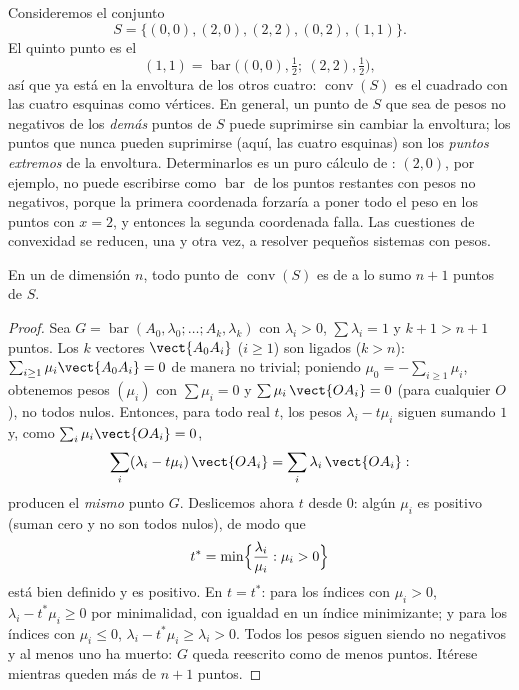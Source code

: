 \begin{example}\label{ex:b2:affine:squarehull}
Consideremos el conjunto
\[
S = \{(0,0), (2,0), (2,2), (0,2), (1,1)\} .
\]
El quinto punto es el 
\[
(1,1) = \operatorname{bar}\bigl((0,0), \tfrac12;\ (2,2),
\tfrac12\bigr),
\]
así que ya está en la envoltura de los otros cuatro:
$\operatorname{conv}(S)$ es el cuadrado con las cuatro esquinas como
vértices. En general, un punto de $S$ que sea  de pesos no
negativos de los \emph{demás} puntos de $S$ puede suprimirse sin
cambiar la envoltura; los puntos que nunca pueden suprimirse (aquí,
las cuatro esquinas) son los \emph{puntos extremos} de la envoltura.
Determinarlos es un puro cálculo de : $(2,0)$, por
ejemplo, no puede escribirse como $\operatorname{bar}$ de los puntos
restantes con pesos no negativos, porque la primera coordenada
forzaría a poner todo el peso en los puntos con $x = 2$, y entonces
la segunda coordenada falla. Las cuestiones de convexidad se reducen,
una y otra vez, a resolver pequeños sistemas con pesos.
\end{example}

\begin{theorem}[Carathéodory]\label{thm:b2:affine:caratheodory}
En un  de dimensión $n$, todo punto de
$\operatorname{conv}(S)$ es  de a lo sumo $n + 1$ puntos de
$S$.
\end{theorem}

\begin{proof}
Sea $G = \operatorname{bar}(A_0, \lambda_0; \dots; A_k, \lambda_k)$
con $\lambda_i > 0$, $\sum\lambda_i = 1$ y $k + 1 > n + 1$ puntos.
Los $k$ vectores $\vect{A_0A_i}$ ($i \geq 1$) son ligados ($k > n$):
$\sum_{i\geq1}\mu_i \vect{A_0A_i} = 0$ de manera no trivial; poniendo
$\mu_0 = -\sum_{i\geq1}\mu_i$, obtenemos pesos $(\mu_i)$ con
$\sum\mu_i = 0$ y $\sum \mu_i\,\vect{OA_i} = 0$ (para cualquier $O$),
no todos nulos. Entonces, para todo real $t$, los pesos $\lambda_i -
t\mu_i$ siguen sumando $1$ y, como $\sum_i\mu_i\vect{OA_i} = 0$,
\[
\sum_i(\lambda_i - t\mu_i)\,\vect{OA_i}
= \sum_i\lambda_i\,\vect{OA_i} :
\]
producen el \emph{mismo} punto $G$. Deslicemos ahora $t$ desde $0$:
algún $\mu_i$ es positivo (suman cero y no son todos nulos), de modo
que
\[
t^* = \min\Bigl\{\frac{\lambda_i}{\mu_i} : \mu_i > 0\Bigr\}
\]
está bien definido y es positivo. En $t = t^*$: para los índices con
$\mu_i > 0$, $\lambda_i - t^*\mu_i \geq 0$ por minimalidad, con
igualdad en un índice minimizante; y para los índices con $\mu_i \leq
0$, $\lambda_i - t^*\mu_i \geq \lambda_i > 0$. Todos los pesos siguen
siendo no negativos y al menos uno ha muerto: $G$ queda reescrito
como  de menos puntos. Itérese mientras queden más de $n +
1$ puntos.
\end{proof}

